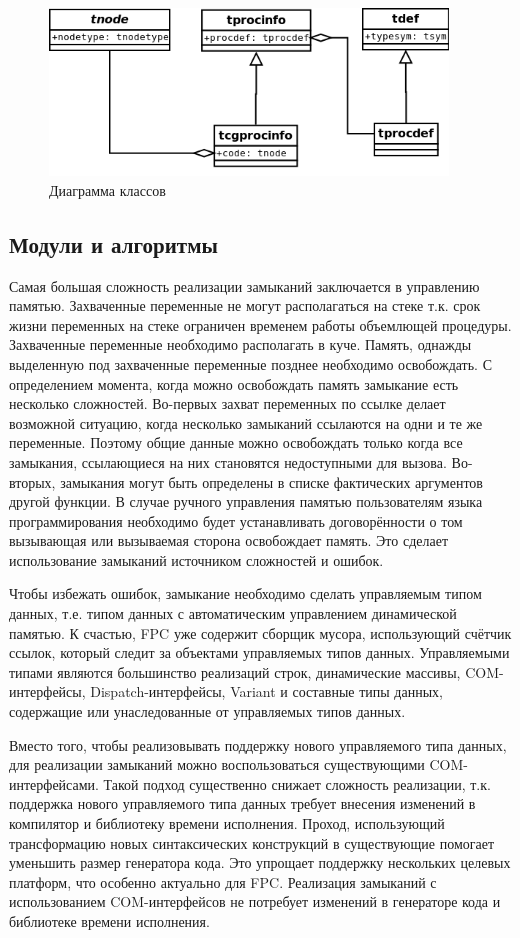 \documentclass{imcs}
\begin{document}
\begin{figure}[htb]
\centering
\includegraphics[width=400px]{./uml/tprocinfo.png}
\caption{Диаграмма классов}
\label{tprocinfo}
\end{figure}

\subsection{Модули и алгоритмы}

Самая большая сложность реализации замыканий заключается в управлению памятью. Захваченные переменные
не могут располагаться на стеке т.к. срок жизни переменных на стеке ограничен временем
работы объемлющей процедуры. Захваченные переменные необходимо располагать в куче. Память, однажды
выделенную под захваченные переменные позднее необходимо освобождать. С определением момента,
когда можно освобождать память замыкание есть несколько сложностей. Во-первых 
захват переменных по ссылке делает возможной ситуацию, когда несколько замыканий ссылаются 
на одни и те же переменные. Поэтому общие данные можно освобождать только когда все замыкания,
ссылающиеся на них становятся недоступными для вызова. Во-вторых, замыкания
могут быть определены в списке фактических аргументов другой функции. В случае ручного управления 
памятью пользователям языка программирования необходимо будет устанавливать договорённости
о том вызывающая или вызываемая сторона освобождает память. Это сделает использование замыканий
источником сложностей и ошибок.

Чтобы избежать ошибок, замыкание необходимо сделать управляемым типом данных, т.е.
типом данных с автоматическим управлением динамической памятью. К счастью, FPC уже содержит
сборщик мусора, использующий счётчик ссылок, который следит за объектами управляемых
типов данных. Управляемыми типами являются 
большинство реализаций строк, динамические массивы, COM-интерфейсы, Dispatch-интерфейсы, Variant и
составные типы данных, содержащие или унаследованные от управляемых типов данных.

Вместо того, чтобы реализовывать поддержку нового управляемого типа данных, для реализации
замыканий можно воспользоваться существующими COM-интерфейсами. Такой подход существенно
снижает сложность реализации, т.к. поддержка нового управляемого типа данных требует внесения
изменений в компилятор и библиотеку времени исполнения. Проход, использующий трансформацию новых синтаксических
конструкций в существующие помогает уменьшить размер генератора кода. Это упрощает
поддержку нескольких целевых платформ, что особенно актуально для FPC. Реализация замыканий 
с использованием COM-интерфейсов не потребует изменений в генераторе кода и библиотеке
времени исполнения.
\end{document}
